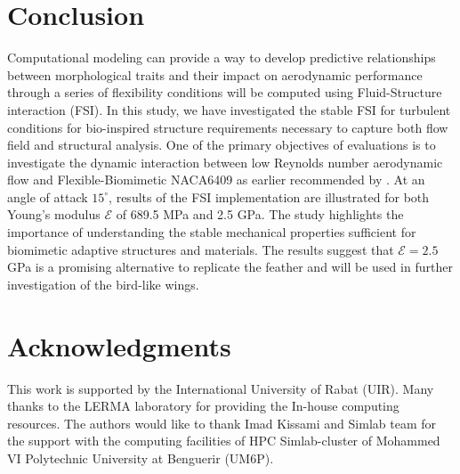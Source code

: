 \documentclass[conf]{new-aiaa}
\begin{document}
\section{Conclusion}
Computational modeling can provide a way to develop predictive relationships between morphological traits and their impact on aerodynamic performance through a series of flexibility conditions will be computed using Fluid-Structure interaction (FSI).
%
In this study, we have investigated the stable FSI for turbulent conditions for bio-inspired structure requirements necessary to capture both flow field and structural analysis.
%
One of the primary objectives of evaluations is to investigate the dynamic interaction between low Reynolds number aerodynamic flow and Flexible-Biomimetic NACA6409 as earlier recommended by \citet{gamble2020load}.
%
At an angle of attack $15^{\circ}$, results of the FSI implementation are illustrated for both Young's modulus $\mathcal{E}$ of 689.5 MPa and 2.5 GPa.
%
The study highlights the importance of understanding the stable mechanical properties sufficient for biomimetic adaptive structures and materials.
%
The results suggest that $\mathcal{E}=2.5$ GPa is a promising alternative to replicate the feather and will be used in further investigation of the bird-like wings. 
\section*{Acknowledgments}
This work is supported by the International University of Rabat (UIR). Many thanks to the LERMA laboratory for providing the In-house computing resources.
%
The authors would like to thank Imad Kissami and Simlab team for the support with the computing facilities of HPC Simlab-cluster of Mohammed VI Polytechnic University at Benguerir (UM6P).


\end{document}

